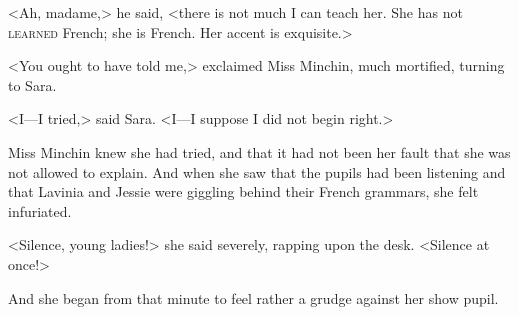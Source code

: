 <Ah, madame,> he said, <there is not much I can teach her. She has not \textsc{learned} French; she is French. Her accent is exquisite.>

<You ought to have told me,> exclaimed Miss Minchin, much mortified, turning to Sara.

<I—I tried,> said Sara. <I—I suppose I did not begin right.>

Miss Minchin knew she had tried, and that it had not been her fault that she was not allowed to explain. And when she saw that the pupils had been listening and that Lavinia and Jessie were giggling behind their French grammars, she felt infuriated.

<Silence, young ladies!> she said severely, rapping upon the desk. <Silence at once!>

And she began from that minute to feel rather a grudge against her show pupil.